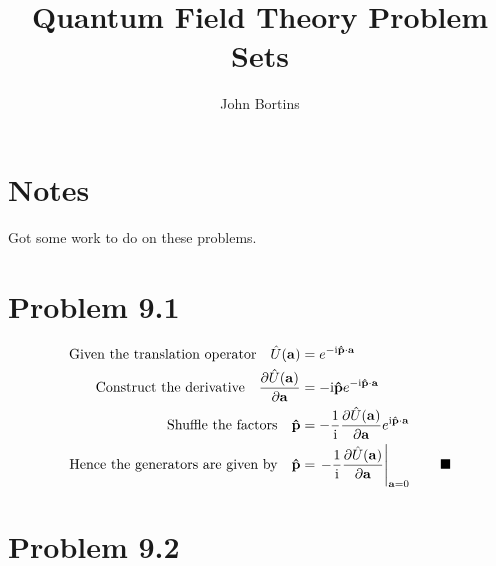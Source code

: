 \documentclass{article}
\title{Quantum Field Theory Problem Sets}
\author{John Bortins}
\begin{document}
 
\maketitle{}

\section*{Notes}

Got some work to do on these problems.
 
\section*{Problem 9.1}

\begin{align*}
\qq*{Given the translation operator}\hat{U}(\vb{a})&=e^{-\text{i}\vb{\hat{p}}\cdot\vb{a}}\\
\qq*{Construct the derivative}\pdv{\hat{U}(\vb{a})}{\vb{a}}&=-\text{i}\vb{\hat{p}}e^{-\text{i}\vb{\hat{p}}\cdot\vb{a}}\\
\qq*{Shuffle the factors}\vb{\hat{p}}&=-\frac{1}{\text{i}}\pdv{\hat{U}(\vb{a})}{\vb{a}}e^{\text{i}\vb{\hat{p}}\cdot\vb{a}}\\
\qq*{Hence the generators are given by}\vb{\hat{p}}&=\eval{-\frac{1}{\text{i}}\pdv{\hat{U}(\vb{a})}{\vb{a}}}_{\vb{a}=0}\qquad\blacksquare
\end{align*}



\section*{Problem 9.2}
\end{document}
